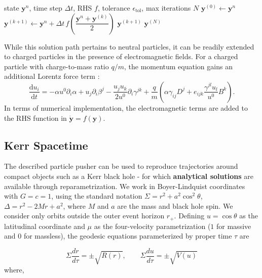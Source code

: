 \documentclass{article}
\begin{document}
\begin{algorithm}[h]
\caption{IMR fixed-point iteration}
\begin{algorithmic}[1]
\Require state $\bm{y}^n$, time step $\Delta t$, RHS $f$, tolerance $\epsilon_\mathrm{tol}$, max iterations $N$
\State $\bm{y}^{(0)} \gets \bm{y}^n$
    \State $\bm{y}^{(k+1)} \gets \bm{y}^n + \Delta t\, f\!\left(\dfrac{\bm{y}^n + \bm{y}^{(k)}}{2}\right)$
        \State \Return $\bm{y}^{(k+1)}$
    \EndIf
\EndFor
\State \Return $\bm{y}^{(N)}$
\end{algorithmic}
\label{alg:IMR_fixed_point}
\end{algorithm}

\noindent
While this solution path pertains to neutral particles, it can be readily extended to charged particles in the presence of electromagnetic fields. For a charged particle with charge-to-mass ratio $q/m$, the momentum equation gains an additional Lorentz force term \cite{Bacchini_2019}:
\begin{equation}
    \frac{\text{d}u_i}{\text{d}t} = -\alpha u^0\partial_i\alpha + u_j\partial_i\beta^j - \frac{u_ju_k}{2u^0}\partial_i\gamma^{jk} + \frac{q}{m}\left(\alpha\gamma_{ij}D^j + e_{ijk}\frac{\gamma^{jl}u_l}{u^0}B^k\right).
\end{equation}
In terms of numerical implementation, the electromagnetic terms are added to the RHS function in $\dot{\bm{y}} = f(\bm{y})$.

\subsection{Kerr Spacetime}

The described particle pusher can be used to reproduce trajectories around compact objects such as a Kerr black hole - for which \textbf{analytical solutions} are available through reparametrization. We work in Boyer-Lindquist coordinates with $G=c=1$, using the standard notation $\Sigma = r^2 + a^2\cos^2\theta$, $\Delta = r^2 - 2Mr + a^2$, where $M$ and $a$ are the mass and black hole spin. We consider only orbits outside the outer event horizon $r_+$. Defining $u = \cos\theta$ as the latitudinal coordinate and $\mu$ as the four-velocity parametrization ($1$ for massive and $0$ for massless), the geodesic equations parameterized by proper time $\tau$ are

\begin{equation}
  \label{eq:geodesic_equations}
   \Sigma\frac{dr}{d\tau} = \pm\sqrt{R(r)},\quad\quad
   \Sigma\frac{du}{d\tau} = \pm\sqrt{V(u)}
\end{equation}
where,
\end{document}
